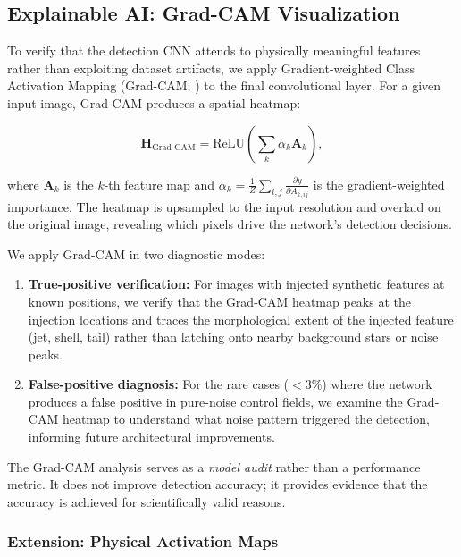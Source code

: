 \documentclass[usenatbib]{mnras}
\begin{document}
\subsection{Explainable AI: Grad-CAM Visualization}\label{sec:xai}

To verify that the detection CNN attends to physically meaningful features rather than exploiting dataset artifacts, we apply Gradient-weighted Class Activation Mapping (Grad-CAM; \citealt{selvaraju17}) to the final convolutional layer. For a given input image, Grad-CAM produces a spatial heatmap:

\begin{equation}\label{eq:gradcam}
\mathbf{H}_{\text{Grad-CAM}} = \text{ReLU}\left(\sum_k \alpha_k \mathbf{A}_k\right),
\end{equation}

where $\mathbf{A}_k$ is the $k$-th feature map and $\alpha_k = \frac{1}{Z}\sum_{i,j}\frac{\partial y}{\partial A_{k,ij}}$ is the gradient-weighted importance. The heatmap is upsampled to the input resolution and overlaid on the original image, revealing which pixels drive the network's detection decisions.

We apply Grad-CAM in two diagnostic modes:

\begin{enumerate}
    \item \textbf{True-positive verification:} For images with injected synthetic features at known positions, we verify that the Grad-CAM heatmap peaks at the injection locations and traces the morphological extent of the injected feature (jet, shell, tail) rather than latching onto nearby background stars or noise peaks.
    \item \textbf{False-positive diagnosis:} For the rare cases ($<3\%$) where the network produces a false positive in pure-noise control fields, we examine the Grad-CAM heatmap to understand what noise pattern triggered the detection, informing future architectural improvements.
\end{enumerate}

The Grad-CAM analysis serves as a \textit{model audit} rather than a performance metric. It does not improve detection accuracy; it provides evidence that the accuracy is achieved for scientifically valid reasons.

\subsubsection{Extension: Physical Activation Maps}
\end{document}
